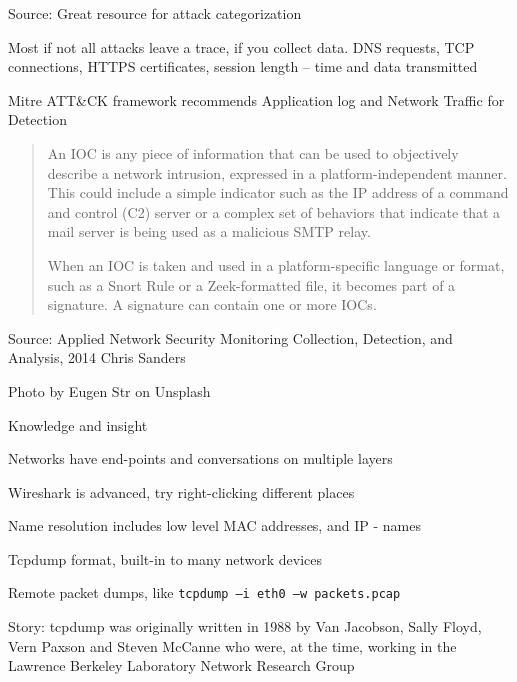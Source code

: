 \documentclass[Screen16to9,17pt]{foils}
\begin{document}

Source:  Great resource for attack categorization

\begin{list2}
\item Most if not all attacks leave a trace, if you collect data. DNS requests, TCP connections, HTTPS certificates, session length -- time and data transmitted
\item Mitre ATT\&CK framework recommends Application log and Network Traffic for Detection
\end{list2}


\begin{quote}
An IOC is any piece of information that can be used to objectively describe a network intrusion, expressed in a platform-independent manner. This could include a simple indicator such as the IP address of a command and control (C2) server or a complex set of behaviors that indicate that a mail server is being used as a malicious SMTP relay.

When an IOC is taken and used in a platform-specific language or format, such as a Snort Rule or a Zeek-formatted file, it becomes part of a signature. A signature can contain one or more IOCs.
\end{quote}

Source: Applied Network Security Monitoring Collection, Detection, and Analysis, 2014 Chris Sanders




\hfill Photo by Eugen Str on Unsplash



{\Large Knowledge and insight}
\begin{list2}
\item Networks have end-points and conversations on multiple layers
\item Wireshark is advanced, try right-clicking different places
\item Name resolution includes low level MAC addresses, and IP - names
\end{list2}

\begin{list2}
\item Tcpdump format, built-in to many network devices
\item Remote packet dumps, like \verb+tcpdump –i eth0 –w packets.pcap+
\item Story: tcpdump was originally written in 1988 by Van Jacobson, Sally Floyd, Vern Paxson and Steven McCanne who were, at the time, working in the Lawrence Berkeley Laboratory Network Research Group\\
\end{list2}
\end{document}
